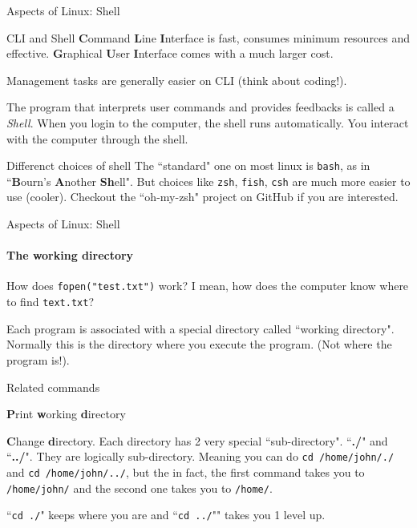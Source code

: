 \begin{frame}{Aspects of Linux: Shell}

\begin{block}{CLI and Shell}
\textbf{C}ommand \textbf{L}ine \textbf{I}nterface is fast, consumes minimum resources and effective. \textbf{G}raphical \textbf{U}ser \textbf{I}nterface comes with a much larger cost. 

Management tasks are generally easier on CLI (think about coding!).

The program that interprets user commands and provides feedbacks is called a \textit{Shell}. When you login to the computer, the shell runs automatically. You interact with the computer through the shell. 
\end{block}

\begin{block}{Differenct choices of shell}
	The ``standard" one on most linux is \texttt{bash}, as in ``\textbf{B}ourn's \textbf{A}nother \textbf{Sh}ell". But choices like \texttt{zsh}, \texttt{fish}, \texttt{csh} are much more easier to use (cooler). Checkout the ``oh-my-zsh" project on GitHub if you are interested.
\end{block}
\end{frame}

\begin{frame}{Aspects of Linux: Shell}
\framesubtitle{The working directory}
	How does \texttt{fopen("test.txt")} work? I mean, how does the computer know where to find \texttt{text.txt}? 
	
	Each program is associated with a special directory called ``working directory". Normally this is the directory where you execute the program. (Not where the program is!). 

\begin{block}{Related commands}
	\small
	\begin{description}[pwd]
		\item[pwd] \textbf{P}rint \textbf{w}orking \textbf{d}irectory
		\item[cd] \textbf{C}hange \textbf{d}irectory. Each directory has 2 very special ``sub-directory". ``\textbf{./}" and ``\textbf{../}". They are logically sub-directory. Meaning you can do \texttt{cd /home/john/./} and \texttt{cd /home/john/../}, but the in fact, the first command takes you to \texttt{/home/john/} and the second one takes you to \texttt{/home/}. 
		
		``\texttt{cd ./}" keeps where you are and ``\texttt{cd ../}"" takes you 1 level up.
	\end{description}
	

\end{block}
\end{frame}

